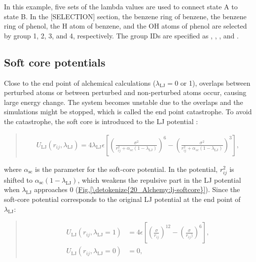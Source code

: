 \documentclass[a4paper,11pt,oneside,english]{sphinxmanual}
\begin{document}
In this example, five sets of the lambda values are used to connect state A to state B.
In the {[}SELECTION{]} section,
the benzene ring of benzene, the benzene ring of phenol, the H atom of benzene, and the OH atoms of phenol are selected by group 1, 2, 3, and 4, respectively.
The group IDs are specified as , , , and .


\subsection{Soft core potentials}
\label{\detokenize{20_Alchemy:soft-core-potentials}}
Close to the end point of alchemical calculations (\(\lambda_{\text{LJ}} = 0\) or 1),
overlaps between perturbed atoms or between perturbed and non-perturbed atoms occur, causing large energy change.
The system becomes unstable due to the overlaps and the simulations might be stopped, which is called the end point catastrophe.
To avoid the catastrophe, the soft core is introduced to the LJ potential :
\begin{quote}

\vspace{-5mm}
\begin{equation*}
\begin{split}U_{\text{LJ}}(r_{ij}, \lambda_{\text{LJ}}) = 4 \lambda_{\text{LJ}} \epsilon \left[ \left( \frac{\sigma^2}{r_{ij}^2+\alpha_{sc} (1-\lambda_{\text{LJ}})} \right)^6 - \left( \frac{\sigma^2}{r_{ij}^2+\alpha_{sc} (1-\lambda_{\text{LJ}})} \right)^3 \right],\end{split}
\end{equation*}
\vspace{-3mm}
\end{quote}

where \(\alpha_{\text{sc}}\) is the parameter for the soft-core potential.
In the potential, \(r_{ij}^2\) is shifted to \(\alpha_{\text{sc}} (1-\lambda_{\text{LJ}})\), which weakens the repulsive part in the LJ potential when \(\lambda_{\text{LJ}}\) approaches 0 (\hyperref[\detokenize{20_Alchemy:lj-softcore}]{Fig.\@ \ref{\detokenize{20_Alchemy:lj-softcore}}}).
Since the soft-core potential corresponds to the original LJ potential at the end point of \(\lambda_{\text{LJ}}\):
\begin{quote}

\vspace{-5mm}
\begin{equation*}
\begin{split}U_{\text{LJ}}(r_{ij}, \lambda_{\text{LJ}}=1) &= 4 \epsilon \left[ \left( \frac{\sigma}{r_{ij}} \right)^{12} - \left( \frac{\sigma}{r_{ij})} \right)^6 \right], \\
U_{\text{LJ}}(r_{ij}, \lambda_{\text{LJ}}=0) &= 0,\end{split}
\end{equation*}
\vspace{-3mm}
\end{quote}
\end{document}
